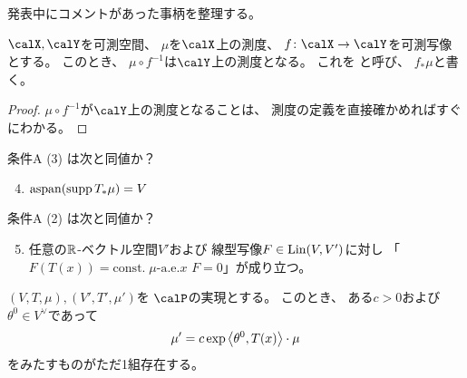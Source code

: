 \documentclass[report]{jlreq}
\begin{document}
%

発表中にコメントがあった事柄を整理する。

\begin{propdef}[測度の押し出し]
    $\calX, \calY$を可測空間、
    $\mu$を$\calX$上の測度、
    $f \colon \calX \to \calY$を可測写像とする。
    このとき、
    $\mu \circ f^{-1}$は$\calY$上の測度となる。
    これを
    と呼び、
    $f_* \mu$と書く。
\end{propdef}

\begin{proof}
    $\mu \circ f^{-1}$が$\calY$上の測度となることは、
    測度の定義を直接確かめればすぐにわかる。
\end{proof}

\begin{problem}
    条件A (3) は次と同値か？
    \begin{enumerate}
        \setcounter{enumi}{3}
        \item $\operatorname{aspan}(\operatorname{supp} T_* \mu) = V$
    \end{enumerate}
\end{problem}

\begin{answer}
    \TODO{}
\end{answer}

\begin{problem}
    条件A (2) は次と同値か？
    \begin{enumerate}
        \setcounter{enumi}{4}
        \item 任意の$\mathbb{R}$-ベクトル空間$V'$および
            線型写像$F \in \operatorname{Lin}(V, V')$に対し
            「$F(T(x)) = \text{const.} \; \text{$\mu$-a.e.$x$}$
                \Rightarrow $F = 0$」が成り立つ。
    \end{enumerate}
\end{problem}

\begin{answer}
\end{answer}

\begin{proposition}
    $(V, T, \mu), (V', T', \mu')$を
    $\calP$の実現とする。
    このとき、
    ある$c > 0$および$\theta^0 \in V^\vee$であって
    \begin{equation}
        \mu'
            = c \exp\left\langle{\theta^0},{T(x)}\right\rangle \cdot \mu
    \end{equation}
    をみたすものがただ1組存在する。
\end{proposition}
\end{document}
